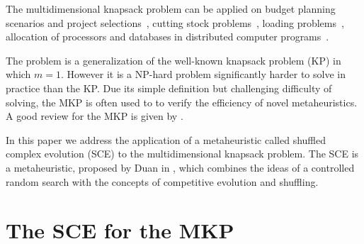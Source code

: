 \documentclass[a0,portrait]{a0poster}
\begin{document}
\begin{multicols}{2}
The multidimensional knapsack problem can be applied on budget planning 
scenarios and project selections~\cite{mcmillan1973resource},
cutting stock problems~\cite{Gilmore-Gomory-1966}, loading problems~\cite{Shih-1979},
allocation of processors and databases in distributed computer programs~\cite{Gavish-Pirckul-1982}.

The problem is a generalization of the well-known knapsack problem (KP) in which
$m = 1$.
However it is a NP-hard problem significantly harder to solve in practice than the KP.
Due its simple definition but challenging difficulty of solving, the MKP is often used to
to verify the efficiency of novel metaheuristics.
A good review for the MKP is given by \cite{freville1994efficient}.

In this paper we address the application of a metaheuristic called
shuffled complex evolution (SCE) to the multidimensional knapsack problem.
The SCE is a metaheuristic, proposed by Duan in \cite{duan1992effective},
which combines the ideas of a controlled random search with the concepts
of competitive evolution and shuffling.

\color{DarkSlateGray} %

\section*{The SCE for the MKP}


\end{multicols}
\end{document}
